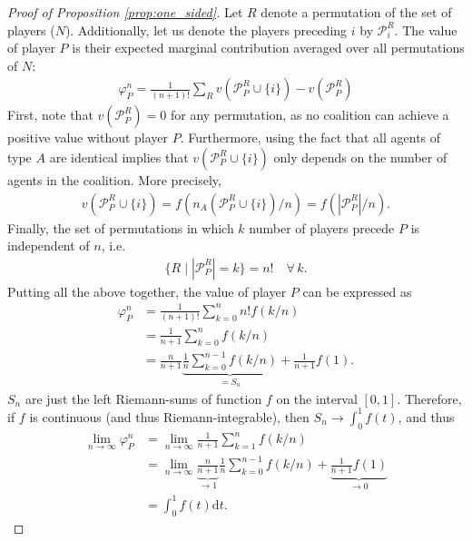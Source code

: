 \documentclass[a4paper]{article}
\newcommand{\dt}{\mathrm{d}t}
\begin{document}
\begin{proof}[Proof of Proposition \ref{prop:one_sided}]
    Let $R$ denote a permutation of the set of players ($N$). Additionally, let us denote the players preceding $i$ by $\mathcal{P}_i^R$. The value of player $P$ is their expected marginal contribution averaged over all permutations of $N$:
    \begin{align*}
        \varphi_P^n = \frac{1}{(n+1)!} \sum_R v(\mathcal{P}_P^R \cup \{i\}) - v(\mathcal{P}_P^R)
    \end{align*}
    First, note that $v(\mathcal{P}_P^R) = 0$ for any permutation, as no coalition can achieve a positive value without player $P$. Furthermore, using the fact that all agents of type $A$ are identical implies that $v(\mathcal{P}_P^R \cup \{i\})$ only depends on the number of agents in the coalition. More precisely, 
    \begin{align*}
        v(\mathcal{P}_P^R \cup \{i\}) = f(n_A(\mathcal{P}_P^R \cup \{i\}) / n) = f(|\mathcal{P}_P^R| / n).
    \end{align*}
    Finally, the set of permutations in which $k$ number of players precede $P$ is independent of $n$, i.e.
    \begin{align*}
        \{R \mid |\mathcal{P}_P^R| = k\} = n! \quad \forall\, k.
    \end{align*}
    Putting all the above together, the value of player $P$ can be expressed as
    \begin{align*}
        \varphi_P^n &= \frac{1}{(n+1)!} \sum_{k=0}^n n! f(k / n) \\
        &= \frac{1}{n+1} \sum_{k=0}^n f(k / n) \\
        &= \frac{n}{n+1} \underbrace{\frac{1}{n} \sum_{k=0}^{n-1} f(k / n)}_{=S_n} + \frac{1}{n+1} f(1).
    \end{align*}
    $S_n$ are just the left Riemann-sums of function $f$ on the interval $[0, 1]$. Therefore, if $f$ is continuous (and thus Riemann-integrable), then $S_n \to \int_0^1 f(t)$, and thus
    \begin{align*}
        \lim_{n \to \infty} \varphi_P^n &= \lim_{n \to \infty} \frac{1}{n+1} \sum_{k=1}^n f(k / n) \\
        &= \lim_{n \to \infty}\underbrace{\frac{n}{n+1}}_{\to 1} \frac{1}{n} \sum_{k=0}^{n-1} f(k / n) + \underbrace{\frac{1}{n+1} f(1)}_{\to 0} \\
        &= \int_0^1 f(t) \dt .
    \end{align*}
\end{proof}
\end{document}
